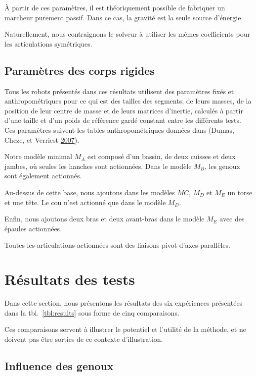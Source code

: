 \documentclass[french,A4paper,]{book}
\begin{document}
À partir de ces paramètres, il est théoriquement possible de fabriquer
un marcheur purement passif. Dans ce cas, la gravité est la seule source
d'énergie.

Naturellement, nous contraignons le solveur à utiliser les mêmes
coefficients pour les articulations symétriques.

\subsection{Paramètres des corps
rigides}\label{paramuxe8tres-des-corps-rigides}

Tous les robots présentés dans ces résultats utilisent des paramètres
fixés et anthropométriques pour ce qui est des tailles des segments, de
leurs masses, de la position de leur centre de masse et de leurs
matrices d'inertie, calculés à partir d'une taille et d'un poids de
référence gardé constant entre les différents tests. Ces paramètres
suivent les tables anthropométriques données dans (Dumas, Cheze, et
Verriest \protect\hyperlink{ref-dumas07}{2007}).

Notre modèle minimal \(M_A\) est composé d'un bassin, de deux cuisses et
deux jambes, où seules les hanches sont actionnées. Dans le modèle
\(M_B\), les genoux sont également actionnés.

Au-dessus de cette base, nous ajoutons dans les modèles \(M C\), \(M_D\)
et \(M_E\) un torse et une tête. Le cou n'est actionné que dans le
modèle \(M_D\).

Enfin, nous ajoutons deux bras et deux avant-bras dans le modèle \(M_E\)
avec des épaules actionnées.

Toutes les articulations actionnées sont des liaisons pivot d'axes
parallèles.

\section{Résultats des tests}\label{sec:restest}

Dans cette section, nous présentons les résultats des six expériences
présentées dans la tbl.~\ref{tbl:results} sous forme de cinq
comparaisons.

Ces comparaisons servent à illustrer le potentiel et l'utilité de la
méthode, et ne doivent pas être sorties de ce contexte d'illustration.

\subsection{Influence des genoux}\label{influence-des-genoux}
\end{document}

